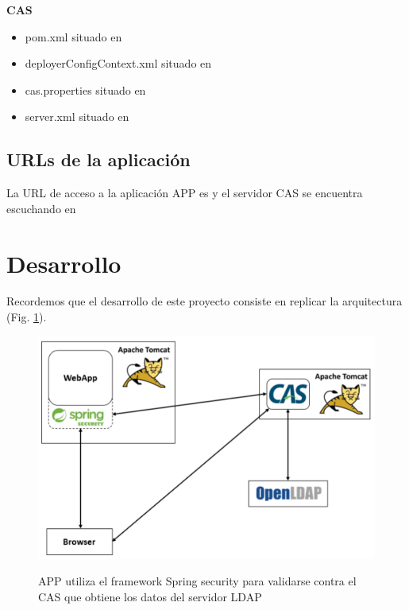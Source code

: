 \documentclass[10pt,a4paper]{article}
\begin{document}
\textbf{CAS}
\begin{itemize}
\item pom.xml situado en \\ 
\item deployerConfigContext.xml situado en \\ 
\item cas.properties situado en 
\item server.xml situado en 
\end{itemize}

\subsection*{URLs de la aplicación}
La URL de acceso a la aplicación APP es  y el servidor CAS se encuentra escuchando en 

\section*{Desarrollo}
Recordemos que el desarrollo de este proyecto consiste en replicar la arquitectura (Fig. \ref{fig:arch}).
\begin{figure}[h!]
  \centering
   \includegraphics[scale=0.2]{architecture.png}\\
  \caption{APP utiliza el framework Spring security para validarse contra el CAS que obtiene los datos del servidor LDAP}
  \label{fig:arch}
\end{figure}\\
\end{document}

